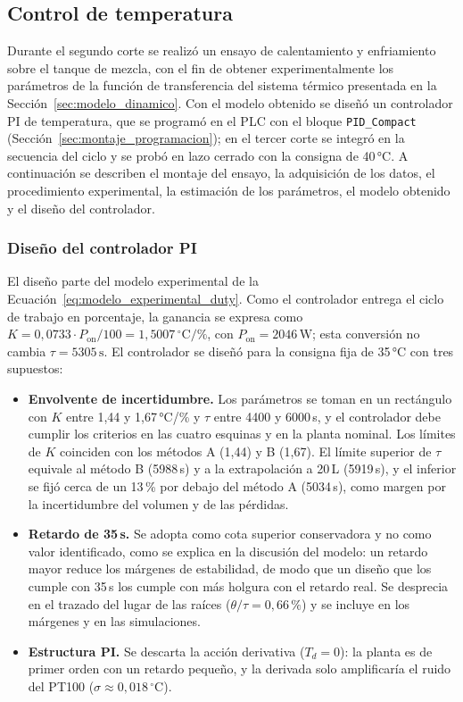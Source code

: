\subsection{Control de temperatura}\label{sec:montaje_control}

Durante el segundo corte se realizó un ensayo de calentamiento y enfriamiento sobre el tanque de mezcla, con el fin de obtener experimentalmente los parámetros de la función de transferencia del sistema térmico presentada en la Sección~\ref{sec:modelo_dinamico}. Con el modelo obtenido se diseñó un controlador PI de temperatura, que se programó en el PLC con el bloque \texttt{PID\_Compact} (Sección~\ref{sec:montaje_programacion}); en el tercer corte se integró en la secuencia del ciclo y se probó en lazo cerrado con la consigna de 40\,°C. A continuación se describen el montaje del ensayo, la adquisición de los datos, el procedimiento experimental, la estimación de los parámetros, el modelo obtenido y el diseño del controlador.



\subsubsection{Diseño del controlador PI}\label{sec:diseno_pi}

El diseño parte del modelo experimental de la Ecuación~\eqref{eq:modelo_experimental_duty}. Como el controlador entrega el ciclo de trabajo en porcentaje, la ganancia se expresa como $K = 0{,}0733 \cdot P_{\mathrm{on}}/100 = 1{,}5007\,^{\circ}\mathrm{C}/\%$, con $P_{\mathrm{on}} = 2046\,\mathrm{W}$; esta conversión no cambia $\tau = 5305\,\mathrm{s}$. El controlador se diseñó para la consigna fija de 35\,°C con tres supuestos:

\begin{itemize}
\item \textbf{Envolvente de incertidumbre.} Los parámetros se toman en un rectángulo con $K$ entre 1,44 y 1,67\,°C/\% y $\tau$ entre 4400 y 6000\,s, y el controlador debe cumplir los criterios en las cuatro esquinas y en la planta nominal. Los límites de $K$ coinciden con los métodos A (1,44) y B (1,67). El límite superior de $\tau$ equivale al método B (5988\,s) y a la extrapolación a 20\,L (5919\,s), y el inferior se fijó cerca de un 13\,\% por debajo del método A (5034\,s), como margen por la incertidumbre del volumen y de las pérdidas.
\item \textbf{Retardo de 35\,s.} Se adopta como cota superior conservadora y no como valor identificado, como se explica en la discusión del modelo: un retardo mayor reduce los márgenes de estabilidad, de modo que un diseño que los cumple con 35\,s los cumple con más holgura con el retardo real. Se desprecia en el trazado del lugar de las raíces ($\theta/\tau = 0{,}66\,\%$) y se incluye en los márgenes y en las simulaciones.
\item \textbf{Estructura PI.} Se descarta la acción derivativa ($T_d = 0$): la planta es de primer orden con un retardo pequeño, y la derivada solo amplificaría el ruido del PT100 ($\sigma \approx 0{,}018\,^{\circ}\mathrm{C}$).
\end{itemize}

